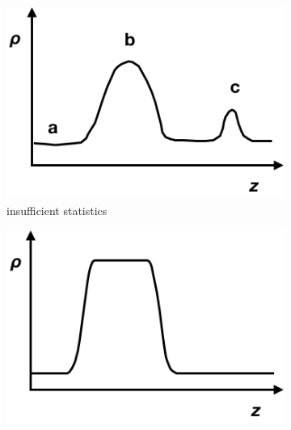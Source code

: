 \documentclass{scrbook}
\begin{document}
\begin{table}
\begin{tabularx}{\textwidth}{
p{}
p{}}
\end{tabularx}
\end{table}
\begin{figure}
	\centering
	\begin{subfigure}{0.4\textwidth} %
    \includegraphics[width=1\textwidth]{gfx/image20.png}
		\caption{insufficient statistics} %
	\end{subfigure}
	\begin{subfigure}{0.4\textwidth} %
    \includegraphics[width=1\textwidth]{gfx/image21.png}
		\caption{} %
	\end{subfigure}

\end{figure}
\end{document}
